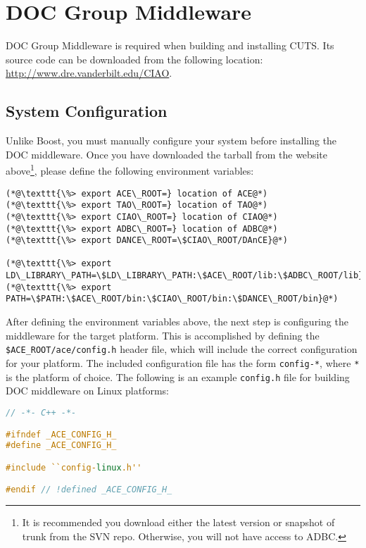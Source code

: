 \section{DOC Group Middleware}
\label{sec:thirdparty-acetaociao}

DOC Group Middleware is required when building and installing CUTS. Its
source code can be downloaded from the following location: 
\url{http://www.dre.vanderbilt.edu/CIAO}.

\subsection{System Configuration}

Unlike Boost, you must manually configure your system before installing
the DOC middleware. Once you have downloaded the tarball from the website 
above\footnote{It is recommended you download either the latest version
or snapshot of trunk from the SVN repo. Otherwise, you will not have access
to ADBC.}, please define the following 
environment variables:
\begin{lstlisting}
(*@\texttt{\%> export ACE\_ROOT=} location of ACE@*)
(*@\texttt{\%> export TAO\_ROOT=} location of TAO@*)
(*@\texttt{\%> export CIAO\_ROOT=} location of CIAO@*)
(*@\texttt{\%> export ADBC\_ROOT=} location of ADBC@*)
(*@\texttt{\%> export DANCE\_ROOT=\$CIAO\_ROOT/DAnCE}@*)

(*@\texttt{\%> export LD\_LIBRARY\_PATH=\$LD\_LIBRARY\_PATH:\$ACE\_ROOT/lib:\$ADBC\_ROOT/lib}@*)
(*@\texttt{\%> export PATH=\$PATH:\$ACE\_ROOT/bin:\$CIAO\_ROOT/bin:\$DANCE\_ROOT/bin}@*)
\end{lstlisting}

After defining the environment variables above, the next step is 
configuring the middleware for the target platform. This is accomplished by 
defining the \texttt{\$ACE\_ROOT/ace/config.h} header file, which will include the correct 
configuration for your platform. The included configuration file has the 
form \texttt{config-*}, where \texttt{*} is the platform of choice.
The following is an example \texttt{config.h} file for building DOC middleware 
on Linux platforms:
\begin{lstlisting}[language=C++]
// -*- C++ -*-

#ifndef _ACE_CONFIG_H_
#define _ACE_CONFIG_H_

#include ``config-linux.h''

#endif // !defined _ACE_CONFIG_H_
\end{lstlisting}

